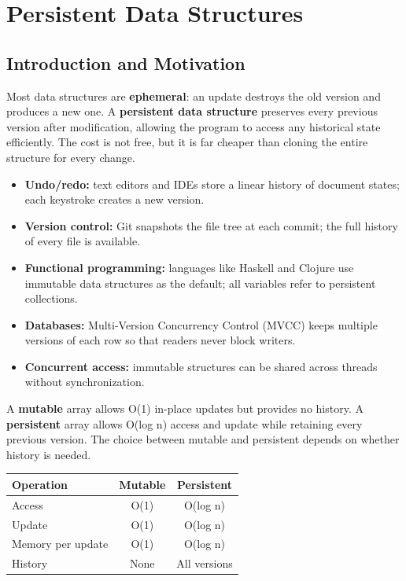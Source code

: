 \chapter{Persistent Data Structures}\label{ch21:persistent-data-structures}

\section{Introduction and Motivation}\label{sec21:introduction}

Most data structures are \textbf{ephemeral}: an update destroys the old version and produces a new one. A \textbf{persistent data structure} preserves every previous version after modification, allowing the program to access any historical state efficiently. The cost is not free, but it is far cheaper than cloning the entire structure for every change.

\begin{itemize}
\item \textbf{Undo/redo:} text editors and IDEs store a linear history of document states; each keystroke creates a new version.
\item \textbf{Version control:} Git snapshots the file tree at each commit; the full history of every file is available.
\item \textbf{Functional programming:} languages like Haskell and Clojure use immutable data structures as the default; all variables refer to persistent collections.
\item \textbf{Databases:} Multi-Version Concurrency Control (MVCC) keeps multiple versions of each row so that readers never block writers.
\item \textbf{Concurrent access:} immutable structures can be shared across threads without synchronization.
\end{itemize}

A \textbf{mutable} array allows O(1) in-place updates but provides no history. A \textbf{persistent} array allows O(log n) access and update while retaining every previous version. The choice between mutable and persistent depends on whether history is needed.

\begin{center}
\begin{tabular}{lcc}
\toprule
Operation & Mutable & Persistent \\
\midrule
Access & O(1) & O(log n) \\
Update & O(1) & O(log n) \\
Memory per update & O(1) & O(log n) \\
History & None & All versions \\
\bottomrule
\end{tabular}
\end{center}


